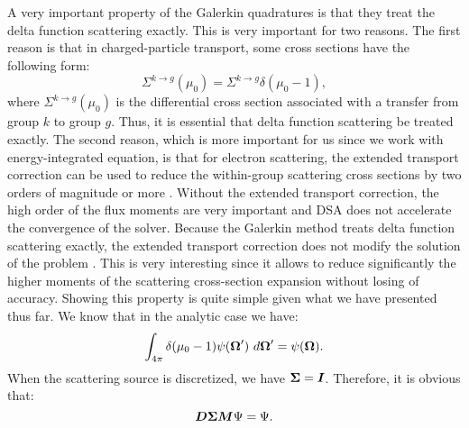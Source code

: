 A very important property of the Galerkin quadratures is that they treat the
delta function scattering exactly. This is very important for two reasons. 
The first reason is that in charged-particle transport, some cross sections 
have the following form:
\begin{equation}
\Sigma^{k\rightarrow g}(\mu_0) = \Sigma^{k\rightarrow g} \delta(\mu_0-1),
\end{equation}
where $\Sigma^{k\rightarrow g}(\mu_0)$ is the differential cross section
associated with a transfer from group $k$ to group $g$. Thus, it is essential
that delta function scattering be treated exactly. The second reason, which is
more important for us since we work with energy-integrated equation, is that for 
electron scattering, the extended transport correction \cite{lathrop} can be 
used to reduce the within-group scattering cross sections by two orders of 
magnitude or more \cite{morel_79}. Without the extended transport correction, 
the high order of the flux moments are very important and DSA does not 
accelerate the convergence of the solver. Because the Galerkin method treats 
delta function  scattering exactly, the extended transport correction does not
modify the solution of the problem \cite{morel_79}. This is very interesting 
since it allows to reduce significantly the higher moments of the scattering
cross-section expansion without losing of accuracy. Showing this property is
quite simple given what we have presented thus far. We know that in the analytic case
we have:
\begin{equation}
\int_{4\pi} \delta(\mu_0-1) \psi(\boldsymbol{\Omega}')\ d\boldsymbol{\Omega}' = \psi(\boldsymbol{\Omega}).
\end{equation}
When the scattering source is discretized, we have $\boldsymbol{\Sigma}=\boldsymbol{I}$.
Therefore, it is obvious that:
\begin{equation}
  \boldsymbol{D\Sigma M}\Psi = \Psi.
\end{equation}

